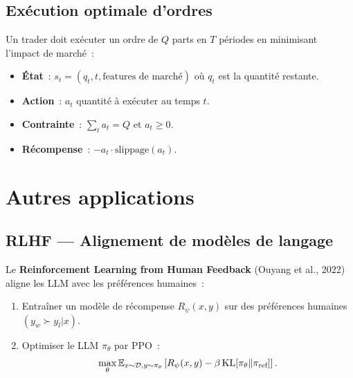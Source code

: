 \subsection{Ex\'ecution optimale d'ordres}

\begin{definition}
Un trader doit ex\'ecuter un ordre de $Q$ parts en $T$ p\'eriodes en minimisant
l'impact de march\'e~:
\begin{itemize}
    \item \textbf{\'Etat}~: $s_t = (q_t, t, \text{features de march\'e})$ o\`u
    $q_t$ est la quantit\'e restante.
    \item \textbf{Action}~: $a_t$ quantit\'e \`a ex\'ecuter au temps $t$.
    \item \textbf{Contrainte}~: $\sum_t a_t = Q$ et $a_t \geq 0$.
    \item \textbf{R\'ecompense}~: $-a_t \cdot \text{slippage}(a_t)$.
\end{itemize}
\end{definition}

\section{Autres applications}

\subsection{RLHF --- Alignement de mod\`eles de langage}

\begin{definition}[RLHF]
Le \textbf{Reinforcement Learning from Human Feedback} (Ouyang et al., 2022)
aligne les LLM avec les pr\'ef\'erences humaines~:
\begin{enumerate}
    \item Entra\^iner un mod\`ele de r\'ecompense $R_\psi(x, y)$ sur des
    pr\'ef\'erences humaines $(y_w \succ y_l | x)$.
    \item Optimiser le LLM $\pi_\theta$ par PPO~:
    \[
        \max_\theta \mathbb{E}_{x \sim \mathcal{D}, y \sim \pi_\theta}\left[
        R_\psi(x, y) - \beta \, \text{KL}[\pi_\theta \| \pi_{\text{ref}}]
        \right].
    \]
\end{enumerate}
\end{definition}

